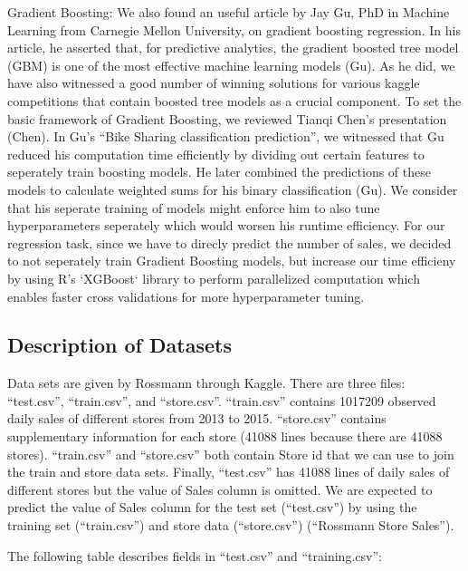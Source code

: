 \documentclass[letterpaper,twocolumn,11pt]{article}
\begin{document}
    Gradient Boosting: We also found an useful article by Jay Gu, PhD in Machine Learning from Carnegie Mellon University, on gradient boosting regression. In his article, he asserted that, for predictive analytics, the gradient boosted tree model (GBM) is one of the most effective machine learning models (Gu). As he did, we have also witnessed a good number of winning solutions for various kaggle competitions that contain boosted tree models as a crucial component. To set the basic framework of Gradient Boosting, we reviewed Tianqi Chen's presentation (Chen). In Gu's ``Bike Sharing classification prediction'', we witnessed that Gu reduced his computation time efficiently by dividing out certain features to seperately train boosting models. He later combined the predictions of these models to calculate weighted sums for his binary classification (Gu). We consider that his seperate training of models might enforce him to also tune hyperparameters seperately which would worsen his runtime efficiency. For our regression task, since we have to direcly predict the number of sales, we decided to not seperately train Gradient Boosting models, but increase our time efficieny by using R's `XGBoost` library to perform parallelized computation which enables faster cross validations for more hyperparameter tuning. 

\subsection{Description of Datasets}
Data sets are given by Rossmann through Kaggle. There are three files: ``test.csv'', ``train.csv'', and ``store.csv''. ``train.csv'' contains 1017209 observed daily sales of different stores from 2013 to 2015. ``store.csv'' contains supplementary information for each store (41088 lines because there are 41088 stores). ``train.csv'' and ``store.csv'' both contain Store id that we can use to join the train and store data sets. Finally, ``test.csv'' has 41088 lines of daily sales of different stores but the value of Sales column is omitted. We are expected to predict the value of Sales column for the test set (``test.csv'') by using the training set (``train.csv'') and store data (``store.csv'') (``Rossmann Store Sales'').

\newpage
The following table describes fields in ``test.csv'' and ``training.csv'':
\end{document}
